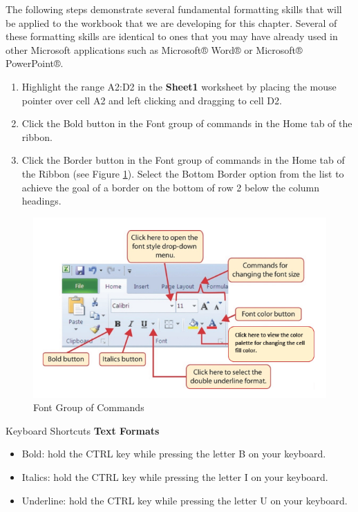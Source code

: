 The following steps demonstrate several fundamental formatting skills that will be applied to the workbook that we are developing for this chapter. Several of these formatting skills are identical to ones that you may have already used in other Microsoft applications such as Microsoft® Word® or
Microsoft® PowerPoint®.

\begin{enumerate}
	\item Highlight the range \textsf{A2:D2} in the \textbf{Sheet1} worksheet by placing the mouse pointer over cell \textsf{A2} and left clicking and dragging to cell \textsf{D2}. 
	\item Click the Bold button in the Font group of commands in the Home tab of the ribbon.
	\item Click the Border button in the Font group of commands in the Home tab of the Ribbon (see Figure \ref{01:fig34}). Select the Bottom Border option from the list to achieve the goal of a border on the bottom of row 2 below the column headings.
\end{enumerate}

\begin{figure}[H]
	\centering
	\includegraphics[width=\maxwidth{.95\linewidth}]{gfx/ch01_fig34}
	\caption{Font Group of Commands}
	\label{01:fig34}
\end{figure}

\begin{center}
	\begin{shtcutbox}{Keyboard Shortcuts}
		\textbf{Text Formats}
		\\
		\begin{itemize}
			\setlength{\itemsep}{0pt}
			\setlength{\parskip}{0pt}
			\setlength{\parsep}{0pt}
			
			\item Bold: hold the CTRL key while pressing the letter B on your keyboard.
			\item Italics: hold the CTRL key while pressing the letter I on your keyboard.
			\item Underline: hold the CTRL key while pressing the letter U on your keyboard.
			
		\end{itemize}
	\end{shtcutbox}
\end{center}

